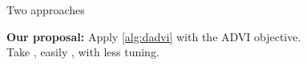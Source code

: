 \documentclass[8pt]{beamer}\usepackage[]{graphicx}\usepackage[]{color}
\begin{document}
\begin{frame}{Two approaches}

\textbf{Our proposal: } Apply \cref{alg:dadvi} with the ADVI objective.  \\
Take , easily , with less tuning.
    
\end{frame}
\end{document}
